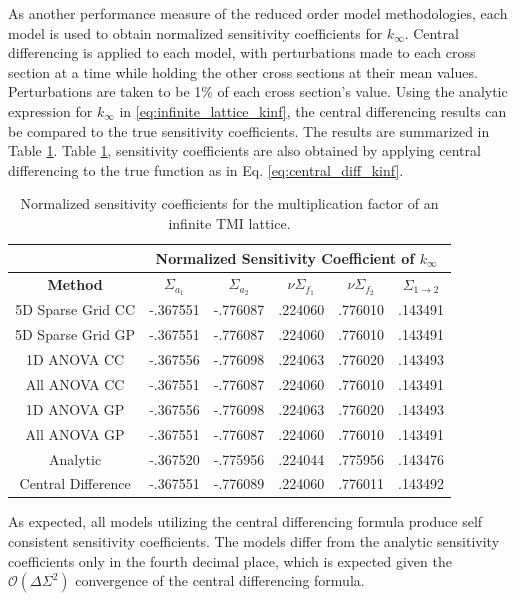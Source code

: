 As another performance measure of the reduced order model methodologies, each model is used to obtain normalized sensitivity coefficients for $k_{\infty}$. Central differencing is applied to each model, with perturbations made to each cross section at a time while holding the other cross sections at their mean values. Perturbations are taken to be 1\% of each cross section's value. Using the analytic expression for $k_{\infty}$ in \ref{eq:infinite_lattice_kinf}, the central differencing results can be compared to the true sensitivity coefficients.   The results are summarized in Table \ref{table:kinf_sensitivities}. Table \ref{table:kinf_sensitivities}, sensitivity coefficients are also obtained by applying central differencing to the true function as in Eq. \ref{eq:central_diff_kinf}. 
\begin{table}
\caption{\label{table:kinf_sensitivities} 
Normalized sensitivity coefficients for the multiplication factor of an infinite TMI lattice.}
\centering
\begin{tabular}{||c|c|c|c|c|c||} 
\hline \hline
  & \multicolumn{5}{|c||}{\textbf{Normalized Sensitivity Coefficient of $k_{\infty}$}}  \\ \hline
\textbf{Method} & $\Sigma_{a_1}$ & $\Sigma_{a_2}$ & $\nu\Sigma_{f_1}$ & $\nu\Sigma_{f_2}$ & $\Sigma_{1\rightarrow 2}$ \\ \hline
5D Sparse Grid CC  & -.367551 & -.776087 & .224060 & .776010 & .143491 \\ \hline
5D Sparse Grid GP  & -.367551 & -.776087 & .224060 & .776010 & .143491 \\ \hline
1D ANOVA CC        & -.367556 & -.776098 & .224063 & .776020 & .143493 \\ \hline
All ANOVA CC       & -.367551 & -.776087 & .224060 & .776010 & .143491 \\ \hline
1D ANOVA GP        & -.367556 & -.776098 & .224063 & .776020 & .143493 \\ \hline
All ANOVA GP       & -.367551 & -.776087 & .224060 & .776010 & .143491 \\ \hline
Analytic           & -.367520 & -.775956 & .224044 & .775956 & .143476 \\ \hline
Central Difference & -.367551 & -.776089 & .224060 & .776011 & .143492 \\
\hline \hline
\end{tabular}
\end{table}
As expected, all models utilizing the central differencing formula produce self consistent sensitivity coefficients. The models differ from the analytic sensitivity coefficients only in the fourth decimal place, which is expected given the $\mathcal{O}(\Delta\Sigma^2)$ convergence  of the central differencing formula.     